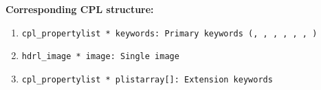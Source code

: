 \begin{datastructdef}
\textbf{Corresponding \ac{CPL} structure:}
\begin{enumerate}
    \item \texttt{cpl\_propertylist * keywords: Primary keywords (,  ,  ,  ,  ,  , )}
    \item \texttt{hdrl\_image * image: Single image}
    \item \texttt{cpl\_propertylist * plistarray[]: Extension keywords}
\end{enumerate}
\end{datastructdef}


